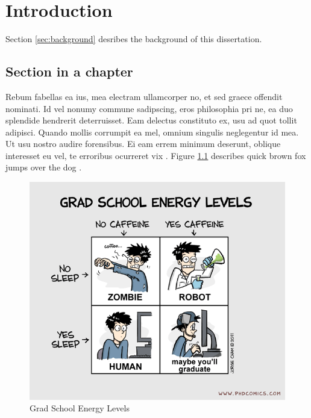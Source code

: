 \documentclass[copyright, reqno]{vcuthesis}
\numberwithin{equation}{chapter}
\begin{document}
\clearpage

\chapter{Introduction \label{chap:chapintro} }
Section \ref{sec:background} desribes the background of this dissertation.
\section{Section in a chapter \label{sec:background} }
Rebum fabellas ea ius, mea electram ullamcorper no, et sed graece offendit nominati. Id vel nonumy commune sadipscing, eros philosophia pri ne, ea duo splendide hendrerit deterruisset. Eam delectus constituto ex, usu ad quot tollit adipisci. Quando mollis corrumpit ea mel, omnium singulis neglegentur id mea. Ut usu nostro audire forensibus. Ei eam errem minimum deserunt, oblique interesset eu vel, te erroribus ocurreret vix \parencite{Narendra_1990}. Figure \ref{fig:fig1} describes quick brown fox jumps over the dog \parencite{tran2009development}.

\begin{figure}
\centering
\includegraphics[scale=0.6]{figures/phd.png}
\caption{Grad School Energy Levels}
\label{fig:fig1}
\end{figure}

\begin{table}
	\caption{\label{table:t1} Table Title}
	\vspace{0.15in}
	\centering
\end{table}
\end{document}
